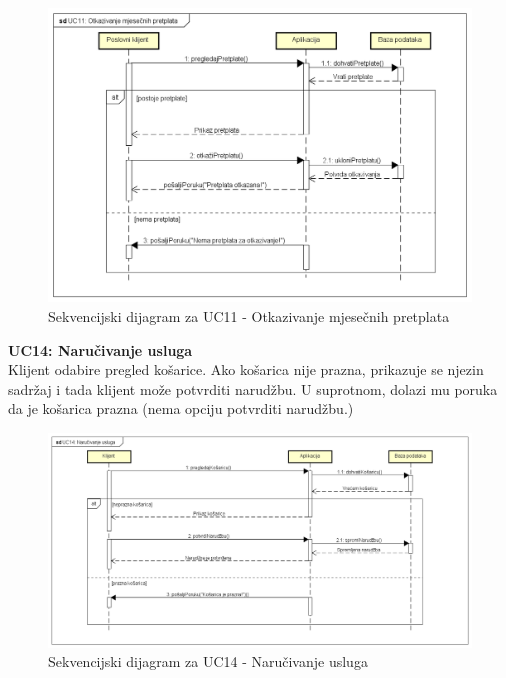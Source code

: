			\begin{figure}[H]
				\includegraphics[scale=0.6]{dijagrami/sekv_uc11.PNG} 
				\centering
				\caption{Sekvencijski dijagram za UC11 - Otkazivanje mjesečnih pretplata}
				\label{fig:sekv_uc11}%
			\end{figure}
		
			\textbf{UC14: Naručivanje usluga}\\
			\noindent \normalsize{Klijent odabire pregled košarice. Ako košarica nije prazna, prikazuje se njezin sadržaj i tada klijent može potvrditi narudžbu. U suprotnom, dolazi mu poruka da je košarica prazna (nema opciju  potvrditi narudžbu.)} \\
			\begin{figure}[H]
				\includegraphics[scale=0.5]{dijagrami/sekv_uc14.PNG} 
				\centering
				\caption{Sekvencijski dijagram za UC14 - Naručivanje usluga}
				\label{fig:sekv_uc14}%
			\end{figure}
		
